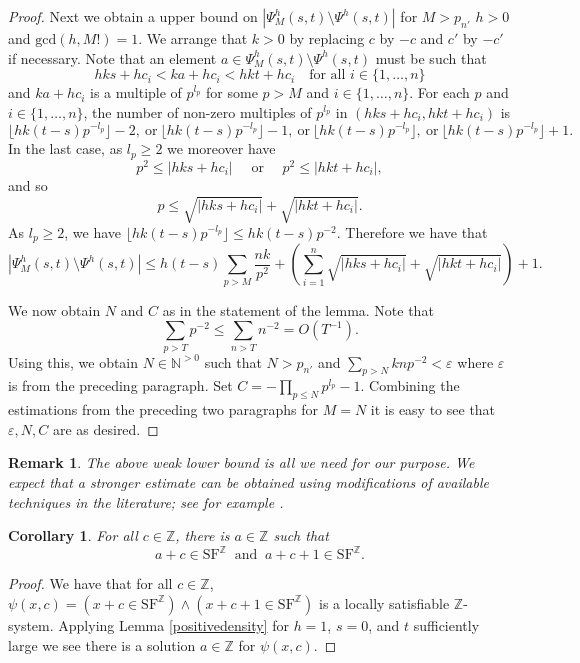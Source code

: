 \documentclass[letterpaper]{amsart}
\newcommand{\nn}{\mathbb{N}}
\newcommand{\zz}{\mathbb{Z}}
\newcommand{\SF}{\mathrm{SF}^\zz}
\newtheorem{cor}[thm]{Corollary}
\newtheorem{rem}[thm]{Remark}
\begin{document}
\begin{proof}
Next we obtain a upper bound on $|\Psi^h_{M}(s,t)\setminus \Psi^h(s,t)|$ for $M> p_{n'} $ $h > 0$ and $\text{gcd}(h, M!)=1$. We  arrange that $k>0$ by replacing $c$ by $-c$ and $c'$ by $-c'$ if necessary. Note that an element   $a \in \Psi^h_{M}(s,t) \setminus  \Psi^h(s,t)$ must be such that
$$hks+hc_i < ka+hc_i < hkt+hc_i \quad \text{for all } i \in \{1, \ldots, n\}$$ and  $ka+hc_i$ is a multiple of $p^{l_p}$ for some $p>M$ and $i \in \{1, \ldots, n\}$. For each $p$ and $i \in \{1, \ldots, n\}$, the number of non-zero multiples of $p^{l_p}$ in $(hks+hc_i, hkt+hc_i)$ is 
$$\lfloor hk(t -s) p^{-l_p}\rfloor -2, \ \text{or}\  \lfloor hk(t -s) p^{-l_p}\rfloor -1, \ \text{or}\ \lfloor hk(t -s) p^{-l_p}\rfloor, \ \text{or}\  \lfloor hk(t -s) p^{-l_p} \rfloor +1.$$
In the last case, as $l_p \geq 2$ we  moreover have
$$ p^2\leq |hks+hc_i| \quad \text{ or }\quad p^2\leq |hkt+hc_i|,$$
and so
$$p\leq \sqrt{|hks+hc_i|} + \sqrt{|hkt+hc_i|}.$$ 
As $l_p \geq 2$, we have  $ \lfloor hk(t -s) p^{-l_p}\rfloor \leq hk(t-s)p^{-2}$. Therefore we have that 
$$|\Psi^h_{M}(s,t)\setminus \Psi^h(s,t)|\leq h(t-s)\sum_{p>M}\frac{nk}{p^2} + \left(\sum_{i=1}^{n}\sqrt{|hks+hc_i|} + \sqrt{|hkt+hc_i|}\right) +1 .$$ 

We now obtain $N$ and $C$ as in the statement of the lemma. Note that $$\sum_{p>T}p^{-2} \leq \sum_{n>T}n^{-2} = O( T^{-1}). $$ Using this, we obtain $N \in \nn^{>0}$ such that $N>p_{n'}$ and $ \sum_{p>N}knp^{-2}< \varepsilon$ where $\varepsilon$ is from the preceding paragraph. Set $C = - \prod_{p\leq N} p^{l_p} -1 $. Combining the estimations from the preceding two paragraphs for $M=N$ it is easy to see that $\varepsilon, N, C$ are as desired.
\end{proof}

\begin{rem}\label{forinstance}
The above weak lower bound is all we need for our purpose. We expect that a stronger estimate can be obtained using modifications of available techniques in the literature; see for example \cite{Mirsky}.
\end{rem}

\begin{cor}
For all $c\in \zz$, there is $a\in \zz$ such that 
$$ a+c \in \SF\  \text{ and }\  a+c+1 \in \SF. $$
\end{cor}
\begin{proof}
We have that for all $c\in \zz$, $\psi(x,c)=(x+c\in \SF)\wedge(x+c+1\in \SF)$ is a locally satisfiable $\zz$-system. Applying Lemma \ref{positivedensity} for $h=1$, $s=0$, and $t$ sufficiently large we see there is a solution $a\in\zz$ for $\psi(x,c)$.
\end{proof}
\end{document}
